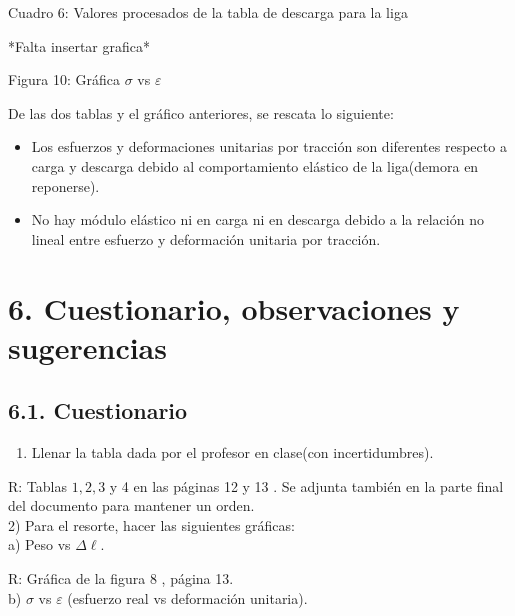 \documentclass[10pt]{article}
\begin{document}
Cuadro 6: Valores procesados de la tabla de descarga para la liga


*Falta insertar grafica*

Figura 10: Gráfica $\sigma$ vs $\varepsilon$

De las dos tablas y el gráfico anteriores, se rescata lo siguiente:

\begin{itemize}
  \item Los esfuerzos y deformaciones unitarias por tracción son diferentes respecto a carga y descarga debido al comportamiento elástico de la liga(demora en reponerse).
  \item No hay módulo elástico ni en carga ni en descarga debido a la relación no lineal entre esfuerzo y deformación unitaria por tracción.
\end{itemize}

\section*{6. Cuestionario, observaciones y sugerencias}
\subsection*{6.1. Cuestionario}
\begin{enumerate}
  \item Llenar la tabla dada por el profesor en clase(con incertidumbres).
\end{enumerate}

R: Tablas $1,2,3$ y 4 en las páginas 12 y 13 . Se adjunta también en la parte final del documento para mantener un orden.\\
2) Para el resorte, hacer las siguientes gráficas:\\
a) Peso vs $\Delta \ell$.

R: Gráfica de la figura 8 , página 13.\\
b) $\sigma$ vs $\varepsilon$ (esfuerzo real vs deformación unitaria).
\end{document}
